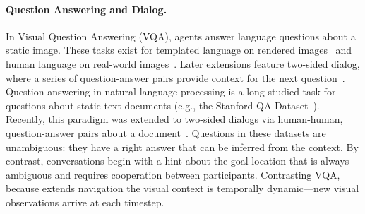 \paragraph{Question Answering and Dialog.}
In Visual Question Answering (VQA), agents answer language questions about a static image.
These tasks exist for templated language on rendered images~\cite{johnson:cvpr17} and human language on real-world images~\cite{antol:iccv15,hudson:cvpr18,zellers:cvpr19}.
Later extensions feature two-sided dialog, where a series of question-answer pairs provide context for the next question~\cite{kottur:naacl19,das:cvpr17}.
Question answering in natural language processing is a long-studied task for questions about static text documents (e.g., the Stanford QA Dataset~\cite{rajpurkar:emnlp16}).
Recently, this paradigm was extended to two-sided dialogs via human-human, question-answer pairs about a document~\cite{choi:emnlp18,saeidi:emnlp18,reddy:tacl19}.
Questions in these datasets are unambiguous: they have a right answer that can be inferred from the context.
By contrast, \dataset{} conversations begin with a hint about the goal location that is always ambiguous and requires cooperation between participants.
Contrasting VQA, because \dataset{} extends navigation the visual context is temporally dynamic---new visual observations arrive at each timestep.

